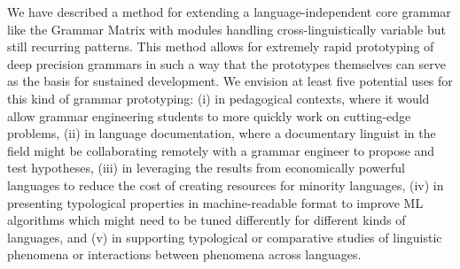 We have described a method for extending a language-independent core
grammar like the Grammar Matrix with modules handling
cross-linguistically variable but still recurring patterns.  This
method allows for extremely rapid prototyping of deep precision
grammars in such a way that the prototypes themselves can serve as the
basis for sustained development.  We envision at least five potential
uses for this kind of grammar prototyping: (i) in pedagogical
contexts, where it would allow grammar engineering students to more
quickly work on cutting-edge problems, (ii) in language documentation,
where a documentary linguist in the field might be collaborating
remotely with a grammar engineer to propose and test hypotheses, (iii)
in leveraging the results from economically powerful languages to
reduce the cost of creating resources for minority languages, (iv) in
presenting typological properties in machine-readable format to
improve ML algorithms which might need to be tuned differently for
different kinds of languages, and (v) in supporting typological or
comparative studies of linguistic phenomena or interactions between
phenomena across languages.


%






